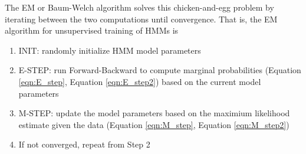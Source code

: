 \documentclass{article}
\begin{document}
The EM or Baum-Welch algorithm solves this chicken-and-egg problem by iterating between the two computations until convergence.  That is, the EM algorithm for unsupervised training of HMMs is
\begin{enumerate}
\item INIT: randomly initialize HMM model parameters
\item E-STEP: run Forward-Backward to compute marginal probabilities (Equation \ref{eqn:E_step}, Equation \ref{eqn:E_step2}) based on the current model parameters
\item M-STEP: update the model parameters based on the maximium likelihood estimate given the data (Equation \ref{eqn:M_step}, Equation \ref{eqn:M_step2})
\item If not converged, repeat from Step 2
\end{enumerate}
\end{document}
